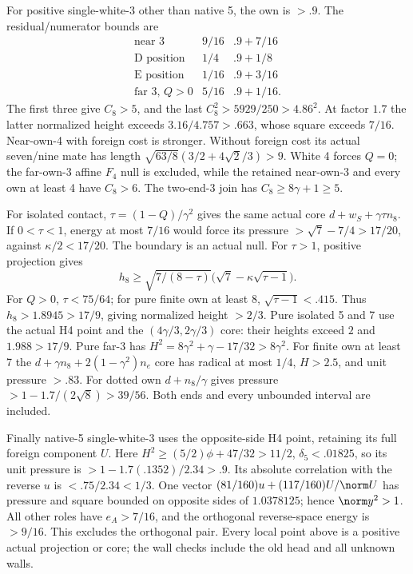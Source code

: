 For positive single-white-3 other than native 5, the own is \(>.9\).
The residual/numerator bounds are
\[
 \begin{array}{c|c|c}
 \text{near 3}&9/16&.9+7/16\\
 \text{D position}&1/4&.9+1/8\\
 \text{E position}&1/16&.9+3/16\\
 \text{far 3, }Q>0&5/16&.9+1/16 .
 \end{array}
\]
The first three give \(C_8>5\), and the last
\(C_8^2>5929/250>4.86^2\).
At factor \(1.7\) the latter normalized height exceeds
\(3.16/4.757>.663\), whose square exceeds \(7/16\).
Near-own-4 with foreign cost is stronger.
Without foreign cost its actual seven/nine mate has length
\(\sqrt{63/8}(3/2+4\sqrt2/3)>9\).
White 4 forces \(Q=0\); the far-own-3 affine \(F_4\) null is
excluded, while the retained near-own-3 and every own at least 4
have \(C_8>6\).
The two-end-3 join has \(C_8\ge8\gamma+1\ge5\).

For isolated contact, \(\tau=(1-Q)/\gamma^2\) gives the same
actual core \(d+w_S+\gamma\tau n_8\).
If \(0<\tau<1\), energy at most \(7/16\) would force its
pressure \(>\sqrt7-7/4>17/20\), against
\(\kappa/2<17/20\).  The boundary is an actual null.
For \(\tau>1\), positive projection gives
\[
 h_8\ge\sqrt{7/(8-\tau)}
               \bigl(\sqrt7-\kappa\sqrt{\tau-1}\bigr).
\]
For \(Q>0\), \(\tau<75/64\); for pure finite own at least 8,
\(\sqrt{\tau-1}<.415\).
Thus \(h_8>1.8945>17/9\), giving normalized height \(>2/3\).
Pure isolated 5 and 7 use the actual H4 point and the
\((4\gamma/3,2\gamma/3)\) core: their heights exceed
\(2\) and \(1.988>17/9\).
Pure far-3 has \(H^2=8\gamma^2+\gamma-17/32>8\gamma^2\).
For finite own at least 7 the
\(d+\gamma n_8+2(1-\gamma^2)n_e\) core has radical
at most \(1/4\), \(H>2.5\), and unit pressure \(>.83\).
For dotted own \(d+n_8/\gamma\) gives pressure
\(>1-1.7/(2\sqrt8)>39/56\).
Both ends and every unbounded interval are included.

Finally native-5 single-white-3 uses the opposite-side H4 point,
retaining its full foreign component \(U\).
Here \(H^2\ge(5/2)\phi+47/32>11/2\),
\(\delta_5<.01825\), so its unit pressure is
\(>1-1.7(.1352)/2.34>.9\).
Its absolute correlation with the reverse \(u\) is
\(<.75/2.34<1/3\).
One vector
\((81/160)u+(117/160)U/\norm U\)
has pressure and square bounded on opposite sides of \(1.0378125\);
hence \(\norm y^2>1\).
All other roles have \(e_A>7/16\), and the orthogonal
reverse-space energy is \(>9/16\).
This excludes the orthogonal pair.  Every local point above is
a positive actual projection or core; the wall checks include
the old head and all unknown walls.

